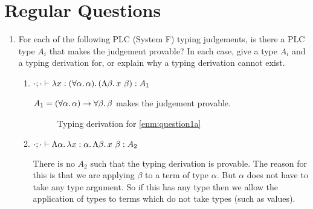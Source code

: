 \documentclass[10pt,\jkfside,a4paper]{article}
\begin{document}
\section{Regular Questions}

\begin{enumerate}

    \item For each of the following PLC (System F) typing judgements, is there a PLC type $A_i$ that makes the judgement provable? In each case, give a type $A_i$ and a typing derivation for, or explain why a
    typing derivation cannot exist.

    \begin{enumerate}

        \item $\cdot; \cdot \vdash \lambda x: (\forall \alpha\ldotp \alpha)\ldotp (\Lambda \beta\ldotp x\ \beta): A_1$

        \label{enm:question1a}

        $A_1 = (\forall \alpha\ldotp \alpha) \to \forall \beta \ldotp \beta$ makes the judgement provable.

        \begin{figure}[H]

            \centering

            \begin{prooftree}
            \end{prooftree}

            \caption{Typing derivation for \ref{enm:question1a}}

        \end{figure}

        \item $\cdot; \cdot \vdash \Lambda \alpha\ldotp \lambda x: \alpha\ldotp \Lambda \beta \ldotp x\ \beta: A_2$

        There is no $A_2$ such that the typing derivation is provable. The reason for this is that we are applying $\beta$ to a term of type $\alpha$. But $\alpha$ does not have to take any type argument. So if
        this has any type then we allow the application of types to terms which do not take types (such as values).


\end{enumerate}
\end{enumerate}
\end{document}
